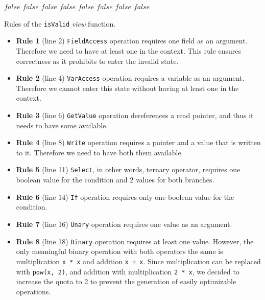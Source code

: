 \documentclass[sigplan,\review anonymous]{acmart}
\begin{document}
\begin{algorithm}
\begin{algorithmic}[1]
    \State \Return $false$
      \State \Return $false$
      \State \Return $false$
      \State \Return $false$
      \State \Return $false$
      \State \Return $false$
      \State \Return $false$
      \State \Return $false$
    \EndIf
  \EndFunction
\end{algorithmic}
\caption{Rules of the \texttt{isValid} \textit{view} function.\label{alg:isValid}}
\end{algorithm}

\begin{itemize}
  \item \textbf{Rule 1} (line 2) \texttt{FieldAccess} 
  operation requires one field as an argument. Therefore we need to have at least
  one in the context. This rule ensures correctness as it prohibits to enter
  the invalid state.
  \item \textbf{Rule 2} (line 4) \texttt{VarAccess} 
  operation requires a variable as an argument. Therefore we cannot enter
  this state without having at least one in the context.
  \item \textbf{Rule 3} (line 6) \texttt{GetValue}
  operation dereferences a read pointer, and thus it needs to have some
  available.
  \item \textbf{Rule 4} (line 8) \texttt{Write}
  operation requires a pointer and a value that is written to it.
  Therefore we need to have both them available.
  \item \textbf{Rule 5} (line 11) \texttt{Select},
  in other words, ternary operator, requires one boolean value for the
  condition and 2 values for both branches.
  \item \textbf{Rule 6} (line 14) \texttt{If}
  operation requires only one boolean value for the condition.
  \item \textbf{Rule 7} (line 16) \texttt{Unary}
  operation requires one value as an argument.
  \item \textbf{Rule 8} (line 18) \texttt{Binary}
  operation requires at least one value. However, the only meaningful binary
  operation with both operators the same is multiplication \texttt{x * x} and
  addition \texttt{x + x}. Since multiplication can be replaced with
  \texttt{pow(x, 2)}, and addition with multiplication \texttt{2 * x}, we
  decided to increase the quota to 2 to prevent the generation of easily
  optimizable operations.
\end{itemize}
\end{document}
